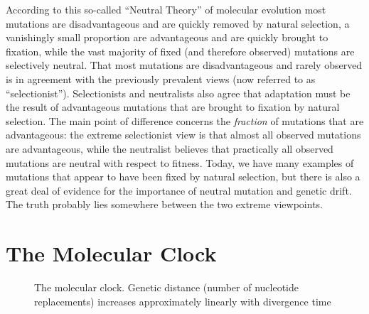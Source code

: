 \documentclass[11pt,a4paper]{book}
\newcommand{\e}{\emph}
\begin{document}
According to this so-called ``Neutral Theory'' of molecular evolution most mutations are disadvantageous and are quickly removed by natural selection, a vanishingly small proportion are advantageous and are quickly brought to fixation, while the vast majority of fixed (and therefore observed) mutations are selectively neutral. That most mutations are disadvantageous and rarely observed is in agreement with the previously prevalent views (now referred to as ``selectionist''). Selectionists and neutralists also agree that adaptation must be the result of advantageous mutations that are brought to fixation by natural selection. The main point of difference concerns the \e{fraction} of mutations that are advantageous: the extreme selectionist view is that almost all observed mutations are advantageous, while the neutralist believes that practically all observed mutations are neutral with respect to fitness. Today, we have many examples of mutations that appear to have been fixed by natural selection, but there is also a great deal of evidence for the importance of neutral mutation and genetic drift. The truth probably lies somewhere between the two extreme viewpoints.

\section{The Molecular Clock}


\begin{figure}[!t]
\begin{center}
\caption{The molecular clock. Genetic distance (number of nucleotide replacements) increases approximately linearly with divergence time}
\label{FIGmoleclock}
\end{center}
\end{figure} 
\end{document}
